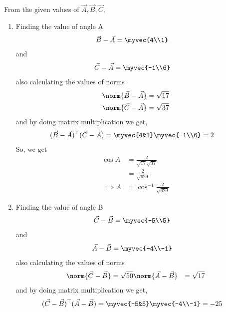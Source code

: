 \documentclass[11pt]{book}
\begin{document}
\begin{enumerate}[label=\thesection.\arabic*.,ref=\thesection.\theenumi]
\begin{align}
  \end{align}
\solution\\
From the given values of $\vec{A},\vec{B},\vec{C}$,\\
\begin{enumerate}
 \item Finding the value of angle A
\begin{align}
 \vec{B}-\vec{A} &=\myvec{4\\1}
\end{align}
and 
\begin{align}
 \vec{C}-\vec{A} &= \myvec{-1\\6}
\end{align}
also calculating the values of norms
\begin{align}
 \norm{\vec{B}-\vec{A}} &= \sqrt{17}\\
 \norm{\vec{C}-\vec{A}} &= \sqrt{37}
\end{align}
and by doing matrix multiplication we get,
\begin{align}
\begin{split}
 (\vec{B}-\vec{A})^{\top}(\vec{C}-\vec{A}) &= \myvec{4&1}\myvec{-1\\6} =2 
\end{split}
\end{align}
So, we get
\begin{align}
 \cos{A} &= \frac{2}{\sqrt{17} \sqrt{37}}\\
 &= \frac{2}{\sqrt{629}}\\
 \implies A& = \cos^{-1}{\frac{2}{\sqrt{629}}}
\end{align}
\item Finding the value of angle B
\begin{align}
 \vec{C}-\vec{B} &=\myvec{-5\\5}
\end{align}
and 
\begin{align}
 \vec{A}-\vec{B} &= \myvec{-4\\-1}
\end{align}
also calculating the values of norms
\begin{align}
 \norm{\vec{C}-\vec{B}} &= \sqrt{50}
 \norm{\vec{A}-\vec{B}} &= \sqrt{17}
\end{align}
and by doing matrix multiplication we get,
\begin{align}
\begin{split}
 (\vec{C}-\vec{B})^{\top}(\vec{A}-\vec{B}) &= \myvec{-5&5}\myvec{-4\\-1} = -25
\end{split}

\end{align}
\end{enumerate}
\end{enumerate}
\end{document}
